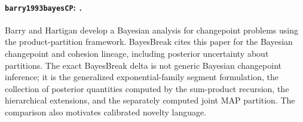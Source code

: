 
\paragraph{\texttt{barry1993bayesCP}: \citet{barry1993bayesCP}.}
Barry and Hartigan develop a Bayesian analysis for changepoint problems using the product-partition framework. BayesBreak cites this paper for the Bayesian changepoint and cohesion lineage, including posterior uncertainty about partitions. The exact BayesBreak delta is not generic Bayesian changepoint inference; it is the generalized exponential-family segment formulation, the collection of posterior quantities computed by the sum-product recursion, the hierarchical extensions, and the separately computed joint MAP partition. The comparison also motivates calibrated novelty language.
